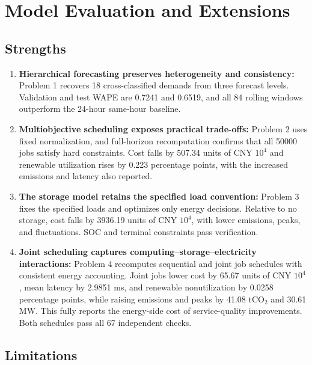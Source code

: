 \section{Model Evaluation and Extensions}

\subsection{Strengths}

\begin{enumerate}
    \item \textbf{Hierarchical forecasting preserves heterogeneity and consistency:}
    Problem 1 recovers 18 cross-classified demands from three forecast levels. Validation and test WAPE are 0.7241 and 0.6519, and all 84 rolling windows outperform the 24-hour same-hour baseline.
	
    \item \textbf{Multiobjective scheduling exposes practical trade-offs:}
    Problem 2 uses fixed normalization, and full-horizon recomputation confirms that all 50000 jobs satisfy hard constraints. Cost falls by 507.34 units of CNY $10^4$ and renewable utilization rises by 0.223 percentage points, with the increased emissions and latency also reported.
	
    \item \textbf{The storage model retains the specified load convention:}
    Problem 3 fixes the specified loads and optimizes only energy decisions. Relative to no storage, cost falls by 3936.19 units of CNY $10^4$, with lower emissions, peaks, and fluctuations. SOC and terminal constraints pass verification.
	
    \item \textbf{Joint scheduling captures computing--storage--electricity interactions:}
    Problem 4 recomputes sequential and joint job schedules with consistent energy accounting. Joint jobs lower cost by 65.67 units of CNY $10^4$, mean latency by 2.9851 ms, and renewable nonutilization by 0.0258 percentage points, while raising emissions and peaks by 41.08 tCO$_2$ and 30.61 MW. This fully reports the energy-side cost of service-quality improvements. Both schedules pass all 67 independent checks.
\end{enumerate}


\subsection{Limitations}

